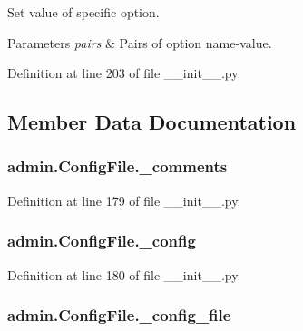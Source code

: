 Set value of specific option. 


\begin{DoxyParams}{Parameters}
{\em pairs} & Pairs of option name-\/value. \\
\hline
\end{DoxyParams}


Definition at line 203 of file \-\_\-\-\_\-init\-\_\-\-\_\-.\-py.



\subsection{Member Data Documentation}
\hypertarget{classadmin_1_1ConfigFile_ac15829b16933412a7db88d3dacdcf345}{
\subsubsection[{\-\_\-comments}]{\setlength{\rightskip}{0pt plus 5cm}admin.\-Config\-File.\-\_\-comments\hspace{0.3cm}{\ttfamily [private]}}}\label{classadmin_1_1ConfigFile_ac15829b16933412a7db88d3dacdcf345}


Definition at line 179 of file \-\_\-\-\_\-init\-\_\-\-\_\-.\-py.

\hypertarget{classadmin_1_1ConfigFile_a5a5c415d13ee87e1a03c9f64231a4fc9}{
\subsubsection[{\-\_\-config}]{\setlength{\rightskip}{0pt plus 5cm}admin.\-Config\-File.\-\_\-config\hspace{0.3cm}{\ttfamily [private]}}}\label{classadmin_1_1ConfigFile_a5a5c415d13ee87e1a03c9f64231a4fc9}


Definition at line 180 of file \-\_\-\-\_\-init\-\_\-\-\_\-.\-py.

\hypertarget{classadmin_1_1ConfigFile_ada03146a25635d360b9994efcd3eb6ce}{
\subsubsection[{\-\_\-config\-\_\-file}]{\setlength{\rightskip}{0pt plus 5cm}admin.\-Config\-File.\-\_\-config\-\_\-file\hspace{0.3cm}{\ttfamily [private]}}}\label{classadmin_1_1ConfigFile_ada03146a25635d360b9994efcd3eb6ce}


